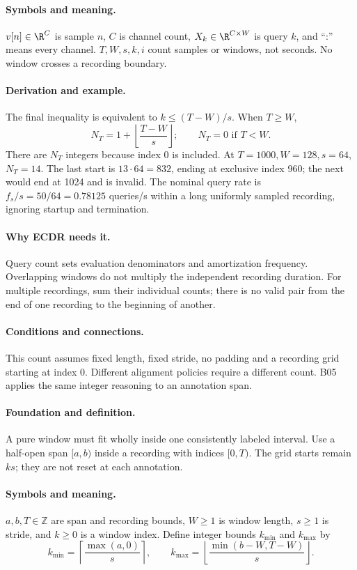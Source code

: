 \paragraph{Symbols and meaning.}
$v[n]\in\R^C$ is sample $n$, $C$ is channel count, $X_k\in\R^{C\times W}$
is query $k$, and ``:'' means every channel. $T,W,s,k,i$ count samples
or windows, not seconds. No window crosses a recording boundary.
\paragraph{Derivation and example.}
The final inequality is equivalent to $k\le(T-W)/s$. When $T\ge W$,
\[
 N_T=1+\left\lfloor\frac{T-W}{s}\right\rfloor;
 \qquad N_T=0\text{ if }T<W.
\]
There are $N_T$ integers because index 0 is included. At
$T=1000,W=128,s=64$, $N_T=14$. The last start is $13\cdot64=832$,
ending at exclusive index 960; the next would end at 1024 and is invalid.
The nominal query rate is $f_s/s=50/64=0.78125$ queries/s within a long
uniformly sampled recording, ignoring startup and termination.
\paragraph{Why ECDR needs it.}
Query count sets evaluation denominators and amortization frequency.
Overlapping windows do not multiply the independent recording duration.
For multiple recordings, sum their individual counts; there is no valid
pair from the end of one recording to the beginning of another.
\paragraph{Conditions and connections.}
This count assumes fixed length, fixed stride, no padding and a recording
grid starting at index 0. Different alignment policies require a different
count. B05 applies the same integer reasoning to an annotation span.

\paragraph{Foundation and definition.}
A pure window must fit wholly inside one consistently labeled interval.
Use a half-open span $[a,b)$ inside a recording with indices $[0,T)$.
The grid starts remain $ks$; they are not reset at each annotation.
\paragraph{Symbols and meaning.}
$a,b,T\in\mathbb Z$ are span and recording bounds, $W\ge1$ is window
length, $s\ge1$ is stride, and $k\ge0$ is a window index. Define integer
bounds $k_{\min}$ and $k_{\max}$ by
\[
 k_{\min}=\left\lceil\frac{\max(a,0)}s\right\rceil,\qquad
 k_{\max}=\left\lfloor\frac{\min(b-W,T-W)}s\right\rfloor.
\]
